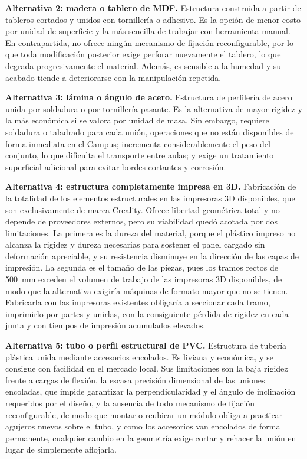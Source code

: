 \documentclass[12pt,a4paper,oneside]{report}
\begin{document}
\textbf{Alternativa 2: madera o tablero de MDF.} Estructura construida a partir de tableros cortados y unidos con tornillería o adhesivo. Es la opción de menor costo por unidad de superficie y la más sencilla de trabajar con herramienta manual. En contrapartida, no ofrece ningún mecanismo de fijación reconfigurable, por lo que toda modificación posterior exige perforar nuevamente el tablero, lo que degrada progresivamente el material. Además, es sensible a la humedad y su acabado tiende a deteriorarse con la manipulación repetida.

\textbf{Alternativa 3: lámina o ángulo de acero.} Estructura de perfilería de acero unida por soldadura o por tornillería pasante. Es la alternativa de mayor rigidez y la más económica si se valora por unidad de masa. Sin embargo, requiere soldadura o taladrado para cada unión, operaciones que no están disponibles de forma inmediata en el Campus; incrementa considerablemente el peso del conjunto, lo que dificulta el transporte entre aulas; y exige un tratamiento superficial adicional para evitar bordes cortantes y corrosión.

\textbf{Alternativa 4: estructura completamente impresa en 3D.} Fabricación de la totalidad de los elementos estructurales en las impresoras 3D disponibles, que son exclusivamente de marca Creality. Ofrece libertad geométrica total y no depende de proveedores externos, pero su viabilidad quedó acotada por dos limitaciones. La primera es la dureza del material, porque el plástico impreso no alcanza la rigidez y dureza necesarias para sostener el panel cargado sin deformación apreciable, y su resistencia disminuye en la dirección de las capas de impresión. La segunda es el tamaño de las piezas, pues los tramos rectos de 500~mm exceden el volumen de trabajo de las impresoras 3D disponibles, de modo que la alternativa exigiría máquinas de formato mayor que no se tienen. Fabricarla con las impresoras existentes obligaría a seccionar cada tramo, imprimirlo por partes y unirlas, con la consiguiente pérdida de rigidez en cada junta y con tiempos de impresión acumulados elevados.

\textbf{Alternativa 5: tubo o perfil estructural de PVC.} Estructura de tubería plástica unida mediante accesorios encolados. Es liviana y económica, y se consigue con facilidad en el mercado local. Sus limitaciones son la baja rigidez frente a cargas de flexión, la escasa precisión dimensional de las uniones encoladas, que impide garantizar la perpendicularidad y el ángulo de inclinación requeridos por el diseño, y la ausencia de todo mecanismo de fijación reconfigurable, de modo que montar o reubicar un módulo obliga a practicar agujeros nuevos sobre el tubo, y como los accesorios van encolados de forma permanente, cualquier cambio en la geometría exige cortar y rehacer la unión en lugar de simplemente aflojarla.
\end{document}
